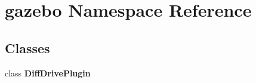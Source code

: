 \section{gazebo Namespace Reference}
\label{namespacegazebo}
\subsection*{Classes}
\begin{DoxyCompactItemize}
\item 
class {\bf DiffDrivePlugin}
\end{DoxyCompactItemize}
